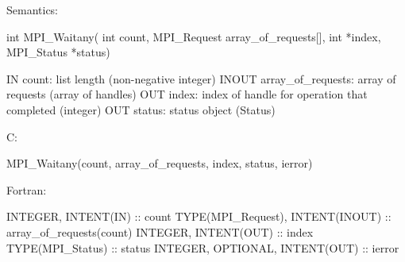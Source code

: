 Semantics:

int MPI_Waitany(
    int count, MPI_Request array_of_requests[], int *index,
    MPI_Status *status)

IN count: list length (non-negative integer)
INOUT array_of_requests: array of requests (array of handles)
OUT index: index of handle for operation that completed (integer)
OUT status: status object (Status)

C:

MPI_Waitany(count, array_of_requests, index, status, ierror)

Fortran:

INTEGER, INTENT(IN) :: count
TYPE(MPI_Request), INTENT(INOUT) :: array_of_requests(count)
INTEGER, INTENT(OUT) :: index
TYPE(MPI_Status) :: status
INTEGER, OPTIONAL, INTENT(OUT) :: ierror
